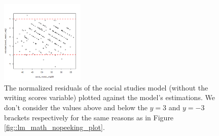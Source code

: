 \documentclass[10pt]{article}
\begin{document}
	 \begin{figure}
	 	\includegraphics[width=4cm]{lm_socst_residual_plot.png}
	 	\centering
	 	\caption{The normalized residuals of the social studies model (without the writing scores variable) plotted against the model's estimations. We don't consider the values above and below the $y=3$ and $y=-3$ brackets respectively for the same reasons as in Figure \ref{fig::lm_math_nopeeking_plot}.}
	 	\label{fig::lm_sosct_nopeeking_plot}
	 \end{figure}
	
\end{document}
